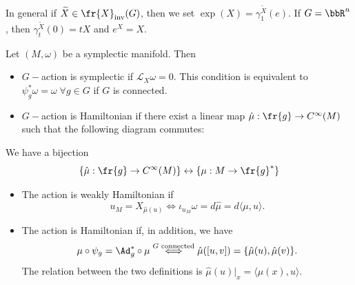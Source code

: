 In general if $\widetilde{X}\in\fr{X}_{\text{inv}}(G)$, then we set $\exp(X)=\gamma_1^{\widetilde{X}}(e)$. If $G=\bbR^n$, then 
$\gamma_t^{\widetilde{X}}(0)=tX$ and $e^X=X$.


    Let $(M,\omega)$ be a symplectic manifold. Then

    \begin{itemize}
        \item $G-$action is symplectic if $\mathcal{L}_X\omega = 0$. This condition is equivalent to 
        $\psi_g^*\omega=\omega\;\forall g\in G$ if $G$ is connected.
        \item $G-$action is Hamiltonian if there exist a linear map $\hat{\mu}:\fr{g}\to C^\infty(M)$
        such that the following diagram commutes: 
        \begin{center}
        \end{center}
    \end{itemize}

    \begin{remark}
        We have a bijection 
        \begin{equation}
            \{\hat{\mu}: \fr{g}\to C^\infty(M)\} \leftrightarrow \{\mu:M\to\fr{g}^*\}
        \end{equation}
    \end{remark}

\begin{itemize}
    \item The action is weakly Hamiltonian if
    \begin{equation}
        u_M = X_{\hat{\mu}(u)} \iff \iota_{u_M}\omega = d\hat{\mu} = d\langle\mu,u\rangle.
    \end{equation}
    \item The action is Hamiltonian if, in addition, we have 
    \begin{equation}
        \mu \circ \psi_g = \Ad_g^*\circ\mu \overset{G\text{ connected}}{\iff} \hat{\mu}([u,v])=\{\hat{\mu}(u),\hat{\mu}(v)\}.
    \end{equation}
    The relation between the two definitions is $\hat{\mu}(u)\big|_x = \langle\mu(x),u\rangle$.
\end{itemize}

